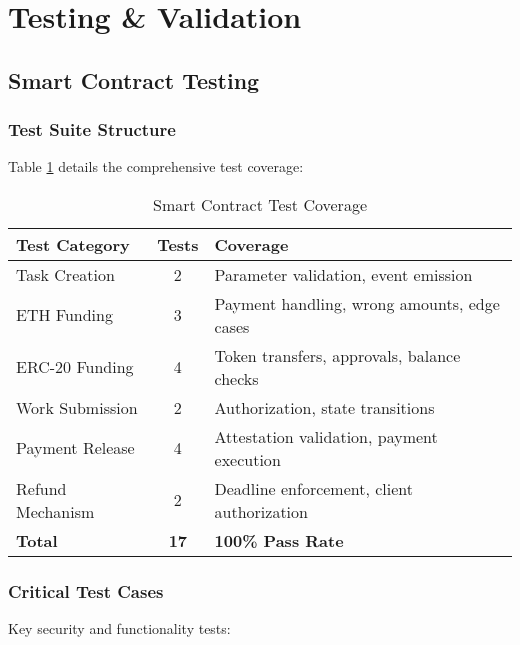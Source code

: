 \documentclass[12pt,a4paper]{article}
\begin{document}
\section{Testing \& Validation}

\subsection{Smart Contract Testing}

\subsubsection{Test Suite Structure}

Table \ref{tab:test-structure} details the comprehensive test coverage:

\begin{table}[h]
\centering
\begin{tabular}{|l|c|p{6cm}|}
\hline
\textbf{Test Category} & \textbf{Tests} & \textbf{Coverage} \\
\hline
Task Creation & 2 & Parameter validation, event emission \\
\hline
ETH Funding & 3 & Payment handling, wrong amounts, edge cases \\
\hline
ERC-20 Funding & 4 & Token transfers, approvals, balance checks \\
\hline
Work Submission & 2 & Authorization, state transitions \\
\hline
Payment Release & 4 & Attestation validation, payment execution \\
\hline
Refund Mechanism & 2 & Deadline enforcement, client authorization \\
\hline
\textbf{Total} & \textbf{17} & \textbf{100\% Pass Rate} \\
\hline
\end{tabular}
\caption{Smart Contract Test Coverage}
\label{tab:test-structure}
\end{table}

\subsubsection{Critical Test Cases}

Key security and functionality tests:
\end{document}
